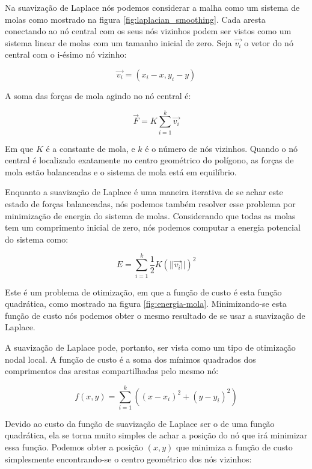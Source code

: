 Na suavização de Laplace nós podemos considerar a malha como um sistema de molas como mostrado na figura \ref{fig:laplacian_smoothing}. Cada aresta conectando ao nó central com os seus nós vizinhos podem ser vistos como um sistema linear de molas com um tamanho inicial de zero. Seja $\vec{v_i}$ o vetor do nó central com o i-ésimo nó vizinho:

\begin{equation*}
    \vec{v_i} = (x_i - x, y_i - y)
\end{equation*}

A soma das forças de mola agindo no nó central é:

\begin{equation*}
    \vec{F} = K \sum_{i=1}^k \vec{v_i}
\end{equation*}

Em que $K$ é a constante de mola, e $k$ é o número de nós vizinhos. Quando o nó central é localizado exatamente no centro geométrico do polígono, as forças de mola estão balanceadas e o sistema de mola está em equilíbrio.

Enquanto a suavização de Laplace é uma maneira iterativa de se achar este estado de forças balanceadas, nós podemos também resolver esse problema por minimização de energia do sistema de molas. Considerando que todas as molas tem um comprimento inicial de zero, nós podemos computar a energia potencial do sistema como:

\begin{equation*}
    E = \sum_{i=1}^k \frac{1}{2} K (||\vec{v_i}||)^2
\end{equation*}

Este é um problema de otimização, em que a função de custo é esta função quadrática, como mostrado na figura \ref{fig:energia-mola}. Minimizando-se esta função de custo nós podemos obter o mesmo resultado de se usar a suavização de Laplace.

A suavização de Laplace pode, portanto, ser vista como um tipo de otimização nodal local. A função de custo é a soma dos mínimos quadrados dos comprimentos das arestas compartilhadas pelo mesmo nó:

\begin{equation*}
    f(x,y) = \sum_{i=1}^k ((x-x_i)^2 + (y-y_i)^2)
\end{equation*}

Devido ao custo da função de suavização de Laplace ser o de uma função quadrática, ela se torna muito simples de achar a posição do nó que irá minimizar essa função. Podemos obter a posição $(x,y)$ que minimiza a função de custo simplesmente encontrando-se o centro geométrico dos nós vizinhos:

